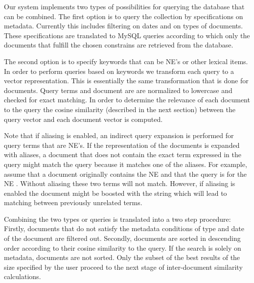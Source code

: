    

Our system implements two types of possibilities for querying the database that can be combined. The first option is to query the collection by specifications on metadata. Currently this includes filtering on dates and on types of documents. These specifications are translated to MySQL queries according to which only the documents that fulfill the chosen constrains are retrieved from the database. 

The second option is to specify keywords that can be NE's or other lexical items. In order to perform queries based on keywords we transform each query to a vector representation. This is essentially the same transformation that is done for documents. Query terms and document are are normalized to lowercase and checked for exact matching. In order to determine the relevance of each document to the query the cosine similarity (described in the next section) between the query vector and each document vector is computed. 

Note that if aliasing is enabled, an indirect query expansion is performed for query terms that are NE's. If the representation of the documents is expanded with aliases, a document that does not contain the exact term expressed in the query might match the query because it matches one of the aliases. For example, assume that a document originally contains the NE  and that the query is for the NE . Without aliasing these two terms will not match. However, if aliasing is enabled the document might be boosted with the string  which will lead to matching between previously unrelated terms. 

Combining the two types or queries is translated into a two step procedure: Firstly, documents that do not satisfy the metadata conditions of type and date of the document are filtered out. Secondly, documents are sorted in descending order according to their cosine similarity to the query. If the search is solely on metadata, documents are not sorted. Only the subset of the best results of the size specified by the user proceed to the next stage of inter-document similarity calculations.
